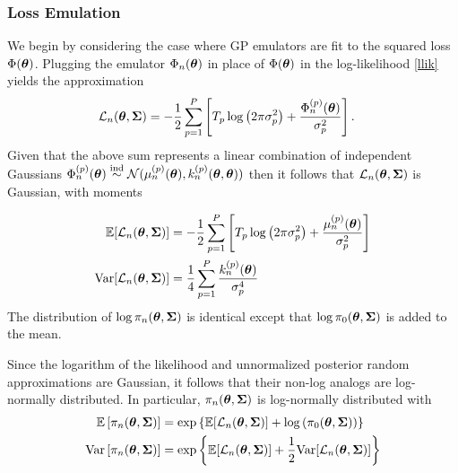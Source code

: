 \documentclass[12pt]{article}
\begin{document}
\subsubsection{Loss Emulation}
We begin by considering the case where GP emulators are fit to the squared loss $\Phi(\boldsymbol{\theta})$.
Plugging the emulator $\Phi_n(\boldsymbol{\theta})$ in place of $\Phi(\boldsymbol{\theta})$ in the log-likelihood
\ref{llik} yields the approximation 
\begin{align*}
\mathcal{L}_{n}(\boldsymbol{\theta}, \boldsymbol{\Sigma}) &= -\frac{1}{2} \sum_{p = 1}^{P} \left[T_{p} \log\left(2\pi \sigma_{p}^2 \right) + \frac{\Phi_{n}^{(p)}(\boldsymbol{\theta})}{\sigma_{p}^2} \right].
\end{align*}
Given that the above sum represents a linear combination of independent Gaussians 
$\Phi_{n}^{(p)}(\boldsymbol{\theta}) \overset{\text{ind}}{\sim} \mathcal{N}(\mu_{n}^{(p)}(\boldsymbol{\theta}), k_{n}^{(p)}(\boldsymbol{\theta}, \boldsymbol{\theta}))$ then it follows that 
$\mathcal{L}_{n}(\boldsymbol{\theta}, \boldsymbol{\Sigma})$ is Gaussian, with moments 

\begin{align}
\mathbb{E}[\mathcal{L}_{n}(\boldsymbol{\theta}, \boldsymbol{\Sigma})] &= -\frac{1}{2} \sum_{p = 1}^{P} \left[T_{p} \log\left(2\pi \sigma_{p}^2 \right) + \frac{\mu_{n}^{(p)}(\boldsymbol{\theta})}{\sigma_{p}^2} \right] \label{llik_approx_mean} \\
\mathrm{Var}[\mathcal{L}_{n}(\boldsymbol{\theta}, \boldsymbol{\Sigma})] &= \frac{1}{4} \sum_{p = 1}^{P} \frac{k_{n}^{(p)}(\boldsymbol{\theta})}{\sigma_{p}^4} \label{llik_approx_var}
\end{align}
The distribution of $\log \pi_{n}(\boldsymbol{\theta}, \boldsymbol{\Sigma})$ is identical except that $\log \pi_0(\boldsymbol{\theta}, \boldsymbol{\Sigma})$ is added to the mean. 

Since the logarithm of the likelihood and unnormalized posterior random approximations are Gaussian, it follows that their non-log analogs are log-normally distributed.
In particular, $\pi_{n}(\boldsymbol{\theta}, \boldsymbol{\Sigma})$ is log-normally distributed with 
\begin{align}
\mathbb{E}\left[\pi_{n}(\boldsymbol{\theta}, \boldsymbol{\Sigma})\right] &= \exp\left\{\mathbb{E}[\mathcal{L}_{n}(\boldsymbol{\theta}, \boldsymbol{\Sigma})] + \log\left(\pi_0(\boldsymbol{\theta}, \boldsymbol{\Sigma})\right) \right\} \\
\mathrm{Var}\left[\pi_{n}(\boldsymbol{\theta}, \boldsymbol{\Sigma})\right] &= \exp\left\{\mathbb{E}[\mathcal{L}_{n}(\boldsymbol{\theta}, \boldsymbol{\Sigma})] + \frac{1}{2}\mathrm{Var}[\mathcal{L}_{n}(\boldsymbol{\theta}, \boldsymbol{\Sigma})] \right\} \label{post_approx_var}
\end{align}
\end{document}
